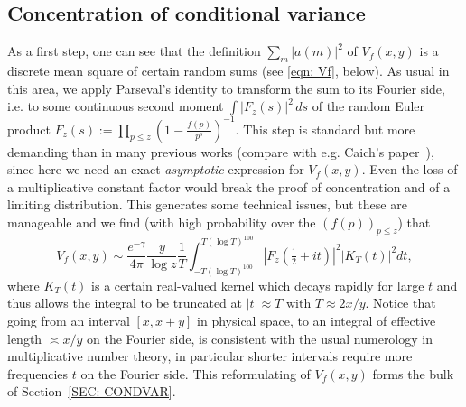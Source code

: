 \documentclass[12pt, notitlepage]{amsart}
\numberwithin{equation}{section}
\theoremstyle{remark}
\theoremstyle{definition}
\theoremstyle{remark}
\numberwithin{equation}{section}
\begin{document}
\subsection{Concentration of conditional variance}\label{subsec:introconc}
As a first step, one can see that the definition $\sum_{m}|a(m)|^2$ of $V_f(x, y)$ is a discrete mean square of certain random sums (see \eqref{eqn: Vf}, below). As usual in this area, we apply Parseval's identity to transform the sum to its Fourier side, i.e. to some continuous second moment $\int |F_z(s)|^{2}\,ds$
of the random Euler product $F_z(s) := \prod_{p\le z}(1-\frac{f(p)}{p^{s}})^{-1}$. This step is standard but more demanding than in many previous works (compare with e.g. Caich's paper~\cite{caichshort}), since here we need an exact \textit{asymptotic} expression for $V_f(x, y)$.  Even the loss of a multiplicative constant factor would break the proof of concentration and of a limiting distribution. This generates some technical issues, but these are manageable and we find (with high probability over the $(f(p))_{p \leq z}$) that
\[V_f(x, y) \sim  \frac{e^{-\gamma}}{4\pi} \frac{y}{\log z} \frac{1}{T} \int_{-T(\log T)^{100}}^{T(\log T)^{100} } |F_z(\tfrac{1}{2}+it)|^{2}|K_T(t)|^{2} dt, \]
where $K_T(t)$ is a certain real-valued kernel which decays rapidly for large $t$ and thus allows the integral to be truncated at $|t|\approx  T$ with $T \approx 2x/y$. Notice that going from an interval $[x,x+y]$ in physical space, to an integral of effective length $\asymp x/y$ on the Fourier side, is consistent with the usual numerology in multiplicative number theory, in particular shorter intervals require more frequencies $t$ on the Fourier side. This reformulating of $V_f(x, y)$ forms the bulk of Section~\ref{SEC: CONDVAR}.
\end{document}
